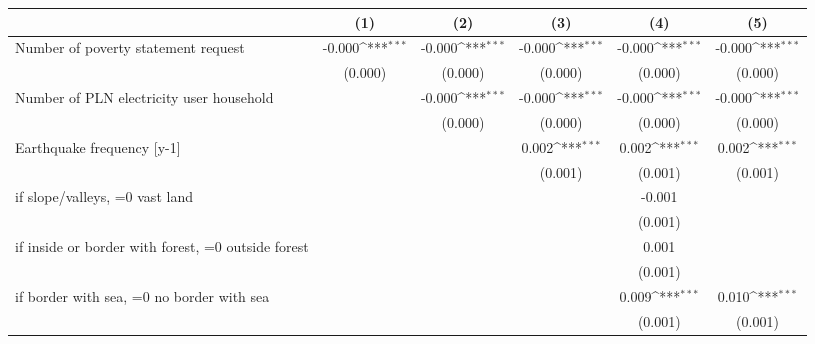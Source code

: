 {
\def\sym#1{\ifmmode^{#1}\else\(^{#1}\)\fi}
\begin{tabular}{l*{5}{c}}
\toprule
                    &\multicolumn{1}{c}{(1)}         &\multicolumn{1}{c}{(2)}         &\multicolumn{1}{c}{(3)}         &\multicolumn{1}{c}{(4)}         &\multicolumn{1}{c}{(5)}         \\
\midrule
Number of poverty statement request&      -0.000\sym{***}&      -0.000\sym{***}&      -0.000\sym{***}&      -0.000\sym{***}&      -0.000\sym{***}\\
                    &     (0.000)         &     (0.000)         &     (0.000)         &     (0.000)         &     (0.000)         \\
\addlinespace
Number of PLN electricity user household&                     &      -0.000\sym{***}&      -0.000\sym{***}&      -0.000\sym{***}&      -0.000\sym{***}\\
                    &                     &     (0.000)         &     (0.000)         &     (0.000)         &     (0.000)         \\
\addlinespace
Earthquake frequency [y-1]&                     &                     &       0.002\sym{***}&       0.002\sym{***}&       0.002\sym{***}\\
                    &                     &                     &     (0.001)         &     (0.001)         &     (0.001)         \\
\addlinespace
=1 if slope/valleys, =0 vast land&                     &                     &                     &      -0.001         &                     \\
                    &                     &                     &                     &     (0.001)         &                     \\
\addlinespace
=1 if inside or border with forest, =0 outside forest&                     &                     &                     &       0.001         &                     \\
                    &                     &                     &                     &     (0.001)         &                     \\
\addlinespace
=1 if border with sea, =0 no border with sea&                     &                     &                     &       0.009\sym{***}&       0.010\sym{***}\\
                    &                     &                     &                     &     (0.001)         &     (0.001)         \\

\end{tabular}}
